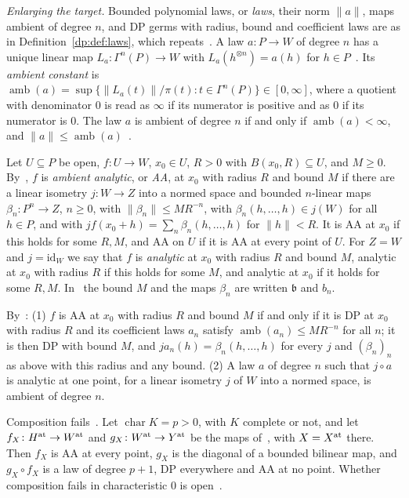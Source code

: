 \documentclass[11pt]{amsart}
\theoremstyle{definition}
\theoremstyle{remark}
\numberwithin{equation}{section}
\newcommand{\id}{\mathrm{id}}
\newcommand{\norm}[1]{\lVert #1\rVert}
\theoremstyle{plain}
\theoremstyle{definition}
\theoremstyle{plain}
\begin{document}
\emph{Enlarging the target.} Bounded polynomial laws, or \emph{laws}, their norm $\norm a$, maps ambient of degree $n$, and DP germs with radius, bound and coefficient laws are as in Definition~\ref{dp:def:laws}, which repeats~\cite[Definition~14.8]{I}. A law $a\colon P\to W$ of degree $n$ has a unique linear map $L_a\colon\Gamma^n(P)\to W$ with $L_a(h^{\otimes n})=a(h)$ for $h\in P$~\cite[Lemma~Q.1]{I}. Its \emph{ambient constant} is $\operatorname{amb}(a)=\sup\{\norm{L_a(t)}/\pi(t):t\in\Gamma^n(P)\}\in[0,\infty]$, where a quotient with denominator $0$ is read as $\infty$ if its numerator is positive and as $0$ if its numerator is $0$. The law $a$ is ambient of degree $n$ if and only if $\operatorname{amb}(a)<\infty$, and $\norm a\le\operatorname{amb}(a)$~\cite[text after Definition~14.8]{I}.

Let $U\subseteq P$ be open, $f\colon U\to W$, $x_0\in U$, $R>0$ with $B(x_0,R)\subseteq U$, and $M\ge0$. By~\cite[Definition~14.7]{I}, $f$ is \emph{ambient analytic}, or \emph{AA}, at $x_0$ with radius $R$ and bound $M$ if there are a linear isometry $j\colon W\to Z$ into a normed space and bounded $n$-linear maps $\beta_n\colon P^n\to Z$, $n\ge0$, with $\norm{\beta_n}\le MR^{-n}$, with $\beta_n(h,\dots,h)\in j(W)$ for all $h\in P$, and with $jf(x_0+h)=\sum_n\beta_n(h,\dots,h)$ for $\norm h<R$. It is AA at $x_0$ if this holds for some $R,M$, and AA on $U$ if it is AA at every point of $U$. For $Z=W$ and $j=\id_W$ we say that $f$ is \emph{analytic} at $x_0$ with radius $R$ and bound $M$, analytic at $x_0$ with radius $R$ if this holds for some $M$, and analytic at $x_0$ if it holds for some $R,M$. In~\cite{I} the bound $M$ and the maps $\beta_n$ are written $\mathfrak b$ and $b_n$.

By~\cite[Proposition~14.9]{I}: (1) $f$ is AA at $x_0$ with radius $R$ and bound $M$ if and only if it is DP at $x_0$ with radius $R$ and its coefficient laws $a_n$ satisfy $\operatorname{amb}(a_n)\le MR^{-n}$ for all $n$; it is then DP with bound $M$, and $ja_n(h)=\beta_n(h,\dots,h)$ for every $j$ and $(\beta_n)_n$ as above with this radius and any bound. (2) A law $a$ of degree $n$ such that $j\circ a$ is analytic at one point, for a linear isometry $j$ of $W$ into a normed space, is ambient of degree $n$.

Composition fails~\cite[Theorem~14.17]{I}. Let $\operatorname{char}K=p>0$, with $K$ complete or not, and let $f_X\colon H^{\rm at}\to W^{\rm at}$ and $g_X\colon W^{\rm at}\to Y^{\rm at}$ be the maps of~\cite[Definition~14.16]{I}, with $X=X^{\rm at}$ there. Then $f_X$ is AA at every point, $g_X$ is the diagonal of a bounded bilinear map, and $g_X\circ f_X$ is a law of degree $p+1$, DP everywhere and AA at no point. Whether composition fails in characteristic $0$ is open~\cite[Remark~14.20]{I}.
\end{document}

